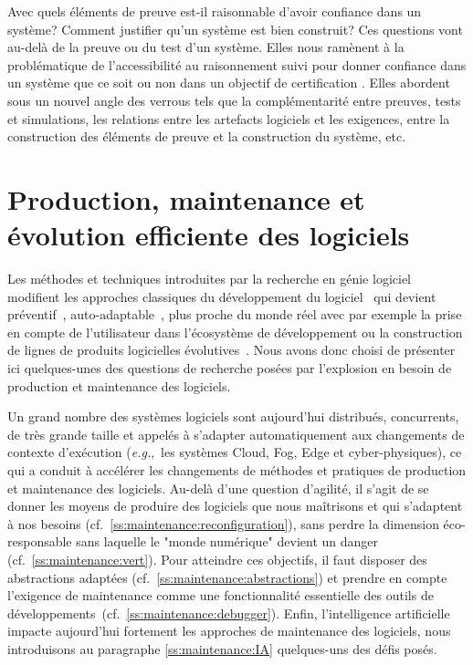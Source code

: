 \documentclass[11pt]{article}
\newcommand{\eg}[0]{\emph{e.g.},~}
\newcommand{\cf}[0]{cf.~}
\newcommand{\defi}[1]{\cite[défi]{#1}}
\begin{document}
Avec quels éléments de preuve est-il raisonnable d'avoir confiance dans un système? Comment justifier qu'un système est bien construit? Ces questions vont au-delà de la preuve ou du test d'un système. Elles nous ramènent à  la problématique de l'accessibilité au raisonnement suivi pour donner confiance dans un système que ce soit ou non dans un objectif de certification \defi{argumentation}.  Elles abordent sous un nouvel angle des verrous tels que la 
complémentarité entre preuves, tests et simulations, les relations entre les artefacts logiciels et les exigences, entre la construction des éléments de preuve et la construction du système, etc. 

\section{Production, maintenance et évolution efficiente des logiciels \label{s:maintenance}}
Les méthodes et techniques introduites par la recherche en génie logiciel modifient les approches classiques du développement du logiciel~\cite{Broy18} qui devient préventif~\cite{Hamilton18}, auto-adaptable~\cite{Chandra2020, murphy19}, plus proche du monde réel avec par exemple la prise en compte de l’utilisateur dans l’écosystème de développement ou la construction de lignes de produits logicielles évolutives~\cite{Marques2019}. Nous avons donc choisi de présenter ici quelques-unes des questions de recherche posées par l'explosion en besoin de production et maintenance des logiciels.


Un grand nombre des systèmes logiciels sont aujourd'hui distribués, concurrents, de très grande taille et appelés à s'adapter automatiquement aux changements de contexte d'exécution (\eg les systèmes Cloud, Fog, Edge et cyber-physiques), ce qui a conduit à accélérer les changements de méthodes et pratiques de production et maintenance des logiciels.   Au-delà d'une question d'agilité, il s'agit de se donner les moyens de produire des logiciels que nous maîtrisons 
et qui s'adaptent à nos besoins (\cf\ref{ss:maintenance:reconfiguration}), sans perdre la dimension éco-responsable sans laquelle le "monde numérique" devient un danger (\cf\ref{ss:maintenance:vert}). 
Pour atteindre ces objectifs, il faut disposer des abstractions adaptées (\cf\ref{ss:maintenance:abstractions}) et prendre en compte l’exigence de maintenance comme une fonctionnalité essentielle des outils de développements~(\cf\ref{ss:maintenance:debugger}). Enfin, l'intelligence artificielle impacte aujourd'hui fortement les approches de maintenance des logiciels, nous introduisons au paragraphe \ref{ss:maintenance:IA} quelques-uns des défis posés.
\end{document}
